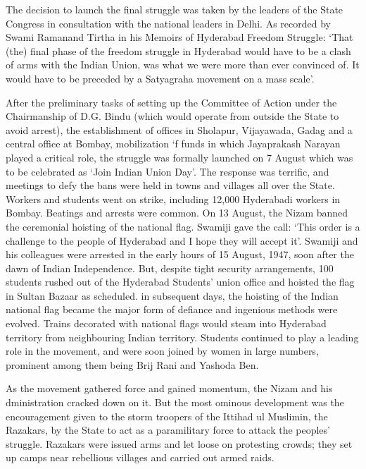 The decision to launch the final struggle was taken by the leaders of the State Congress in consultation with the national leaders in Delhi. As recorded by Swami Ramanand Tirtha in his Memoirs of Hyderabad Freedom Struggle: ‘That (the) final phase of the freedom struggle in Hyderabad would have to be a clash of arms with the Indian Union, was what we were more than ever convinced of. It would have to be preceded by a Satyagraha movement on a mass scale’. 

After the preliminary tasks of setting up the Committee of Action under the Chairmanship of D.G. Bindu (which would operate from outside the State to avoid arrest), the establishment of offices in Sholapur, Vijayawada, Gadag and a central office at Bombay, mobilization ‘f funds in which Jayaprakash Narayan played a critical role, the struggle was formally launched on 7 August which was to be celebrated as ‘Join Indian Union Day’. The response was terrific, and meetings to defy the bans were held in towns and villages all over the State. Workers and students went on strike, including 12,000 Hyderabadi workers in Bombay. Beatings and arrests were common. On 13 August, the Nizam banned the ceremonial hoisting of the national flag. Swamiji gave the call: ‘This order is a challenge to the people of Hyderabad and I hope they will accept it’. Swamiji and his colleagues were arrested in the early hours of 15 August, 1947, soon after the dawn of Indian Independence. But, despite tight security arrangements, 100 students rushed out of the Hyderabad Students’ union office and hoisted the flag in Sultan Bazaar as scheduled. in subsequent days, the hoisting of the Indian national flag became the major form of defiance and ingenious methods were evolved. Trains decorated with national flags would steam into Hyderabad territory from neighbouring Indian territory. Students continued to play a leading role in the movement, and were soon joined by women in large numbers, prominent among them being Brij Rani and Yashoda Ben. 

As the movement gathered force and gained momentum, the Nizam and his dministration cracked down on it. But the most ominous development was the encouragement given to the storm troopers of the Ittihad ul Muslimin, the Razakars, by the State to act as a paramilitary force to attack the peoples’ struggle. Razakars were issued arms and let loose on protesting crowds; they set up camps near rebellious villages and carried out armed raids. 

